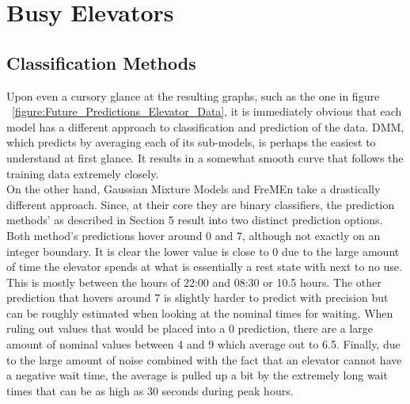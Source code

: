 \section{ Busy Elevators }

\subsection{ Classification Methods }

Upon even a cursory glance at the resulting graphs, such as the one in figure
~\ref{figure:Future_Predictions_Elevator_Data}, it is immediately
obvious that each model has a different approach to classification and
prediction of the data. DMM, which predicts by
averaging each of its sub-models, is perhaps the easiest to understand at first
glance. It results in a somewhat smooth curve that follows the training data
extremely closely. \\

On the other hand, Gaussian Mixture Models and FreMEn take a drastically
different approach. Since, at their core they are binary classifiers, the
prediction methods' as described in Section 5 result into two distinct
prediction options. Both method's predictions hover around 0 and 7, although
not exactly on an integer boundary. It is clear the lower value is close to 0
due to the large amount of time the elevator spends at what is essentially a
rest state with next to no use. This is mostly between the hours of 22:00 and
08:30 or 10.5 hours. The other prediction that hovers around 7
is slightly harder to predict with precision but can be roughly estimated when
looking at the nominal times for waiting. When ruling out values that would be
placed into a 0 prediction, there are a large amount of nominal values between 4
and 9 which average out to 6.5. Finally, due to the large amount of noise
combined with the fact that an elevator cannot have a negative wait time,
the average is pulled up a bit by the extremely long wait times that can be
as high as 30 seconds during peak hours. \\

